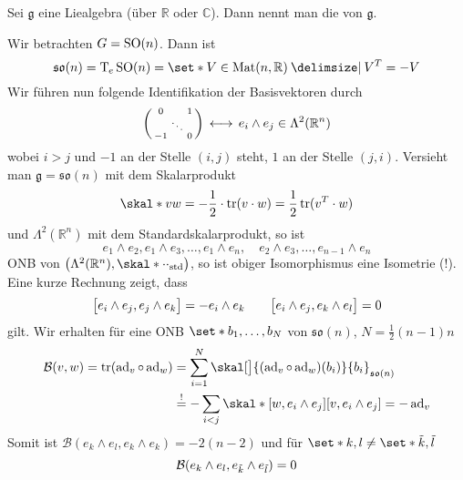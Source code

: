 \begin{definition}[{name=[Killingform]}]
	Sei $\mathfrak{g}$ eine Liealgebra (über $\mathbb{R}$ oder $\mathbb{C}$).
	Dann nennt man 
	die  von $\mathfrak{g}$.
\end{definition}

\begin{beispiel*}[{name=[spezielle orthogonale Gruppe]}]
	Wir betrachten $G=\SO(n)$.
	Dann ist 
	\[
		\mathfrak{so}(n) = \Tmap_e\SO(n) = \set*{V \in \Mat(n,\mathbb{R}) \given V^T=-V}
	\]
	Wir führen nun folgende Identifikation der Basisvektoren durch
	\[
		\begin{psmallmatrix}
			0 & & 1 \\
			& \ddots & \\
			-1 & & 0
		\end{psmallmatrix} \,\longleftrightarrow\, e_i \wedge e_j \in \Lambda^2(\mathbb{R}^n)
	\]
	wobei $i > j$ und $-1$ an der Stelle $(i,j)$ steht, $1$ an der Stelle $(j,i)$.
	Versieht man $\mathfrak{g} = \mathfrak{so}(n)$ mit dem Skalarprodukt
	\[
		\skal*{v}{w} = - \frac{1}{2}  \cdot \tr(v \cdot w) = \frac{1}{2} \tr(v^T \cdot w)
	\]
	und $\Lambda^2(\mathbb{R}^n)$ mit dem Standardskalarprodukt, so ist
	\[
		e_1 \wedge e_2, e_1 \wedge e_3, \ldots , e_1 \wedge e_n, \quad  e_2 \wedge e_3, \ldots , e_{n-1} \wedge e_n
	\]
	ONB von $\enbrace*{\Lambda^2(\mathbb{R}^n), \skal*{\cdot}{\cdot}_{\mathrm{std}}}$, so ist obiger Isomorphismus eine Isometrie (!).
	Eine kurze Rechnung zeigt, dass
	\[
		\benbrace[\big]{e_i \wedge e_j , e_j \wedge e_k} = - e_i \wedge e_k \qquad \benbrace[\big]{e_i \wedge e_j, e_k \wedge e_l}= 0
	\]
	gilt.
	Wir erhalten für eine ONB $\set*{b_1, \ldots ,b_N}$ von $\mathfrak{so}(n)$, $N=\frac{1}{2}(n-1)n$
	\begin{align}
		\mathcal{B}(v,w) = \tr \enbrace*{\ad_v \circ \ad_w} &= \sum_{i=1}^{N} \skal[\big]{(\ad_v \circ \ad_w)(b_i)}{b_i}_{\mathfrak{so}(n)} \\
		&\stackrel{!}{=} -\sum_{i<j} \skal*{ \benbrace*{w,e_i \wedge e_j}}{ \benbrace*{v, e_i \wedge e_j}} = - \ad_v
	\end{align}
	Somit ist $\mathcal{B}(e_k \wedge e_l, e_k \wedge e_k)=-2(n-2)$ und für $\set*{k,l} \neq \set*{\tilde{k},\tilde{l}}$
	\[
		\mathcal{B} \enbrace*{e_k \wedge e_l, e_{\tilde{k}} \wedge e_{\tilde{l}}} =0
	\]
\end{beispiel*}

